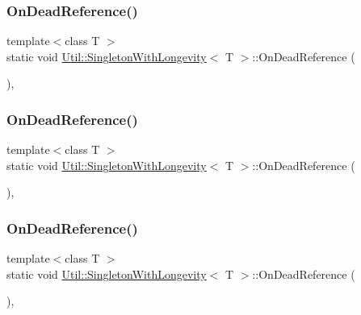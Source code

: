 \subsubsection{\texorpdfstring{OnDeadReference()}{OnDeadReference()}\hspace{0.1cm}{\footnotesize\ttfamily [1/3]}}
{\footnotesize\ttfamily template$<$class T $>$ \\
static void \mbox{\hyperlink{classUtil_1_1SingletonWithLongevity}{Util\+::\+Singleton\+With\+Longevity}}$<$ T $>$\+::On\+Dead\+Reference (\begin{DoxyParamCaption}{ }\end{DoxyParamCaption})\hspace{0.3cm}{\ttfamily [inline]}, {\ttfamily [static]}}

\mbox{\label{classUtil_1_1SingletonWithLongevity_a8eafdc86338509e86107e686fc22cbed}} 
\subsubsection{\texorpdfstring{OnDeadReference()}{OnDeadReference()}\hspace{0.1cm}{\footnotesize\ttfamily [2/3]}}
{\footnotesize\ttfamily template$<$class T $>$ \\
static void \mbox{\hyperlink{classUtil_1_1SingletonWithLongevity}{Util\+::\+Singleton\+With\+Longevity}}$<$ T $>$\+::On\+Dead\+Reference (\begin{DoxyParamCaption}{ }\end{DoxyParamCaption})\hspace{0.3cm}{\ttfamily [inline]}, {\ttfamily [static]}}

\mbox{\label{classUtil_1_1SingletonWithLongevity_a8eafdc86338509e86107e686fc22cbed}} 
\subsubsection{\texorpdfstring{OnDeadReference()}{OnDeadReference()}\hspace{0.1cm}{\footnotesize\ttfamily [3/3]}}
{\footnotesize\ttfamily template$<$class T $>$ \\
static void \mbox{\hyperlink{classUtil_1_1SingletonWithLongevity}{Util\+::\+Singleton\+With\+Longevity}}$<$ T $>$\+::On\+Dead\+Reference (\begin{DoxyParamCaption}{ }\end{DoxyParamCaption})\hspace{0.3cm}{\ttfamily [inline]}, {\ttfamily [static]}}

